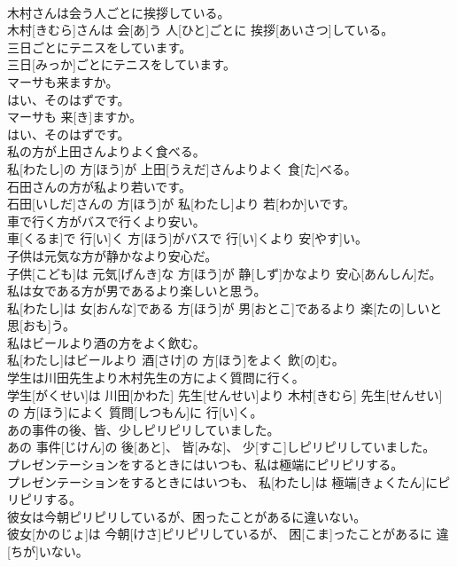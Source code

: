 \documentclass[8pt]{extreport}
\begin{document}
\begin{CJK}{UTF8}{min}
\\	木村さんは会う人ごとに挨拶している。	
\\	木村[きむら]さんは 会[あ]う 人[ひと]ごとに 挨拶[あいさつ]している。	
\\	三日ごとにテニスをしています。	
\\	三日[みっか]ごとにテニスをしています。	
\\	マーサも来ますか。 
\\	はい、そのはずです。	
\\	マーサも 来[き]ますか。 
\\	はい、そのはずです。	
\\	私の方が上田さんよりよく食べる。	
\\	私[わたし]の 方[ほう]が 上田[うえだ]さんよりよく 食[た]べる。	
\\	石田さんの方が私より若いです。	
\\	石田[いしだ]さんの 方[ほう]が 私[わたし]より 若[わか]いです。	
\\	車で行く方がバスで行くより安い。	
\\	車[くるま]で 行[い]く 方[ほう]がバスで 行[い]くより 安[やす]い。	
\\	子供は元気な方が静かなより安心だ。	
\\	子供[こども]は 元気[げんき]な 方[ほう]が 静[しず]かなより 安心[あんしん]だ。	
\\	私は女である方が男であるより楽しいと思う。	
\\	私[わたし]は 女[おんな]である 方[ほう]が 男[おとこ]であるより 楽[たの]しいと 思[おも]う。	
\\	私はビールより酒の方をよく飲む。	
\\	私[わたし]はビールより 酒[さけ]の 方[ほう]をよく 飲[の]む。	
\\	学生は川田先生より木村先生の方によく質問に行く。	
\\	学生[がくせい]は 川田[かわた] 先生[せんせい]より 木村[きむら] 先生[せんせい]の 方[ほう]によく 質問[しつもん]に 行[い]く。	
\\	あの事件の後、皆、少しピリピリしていました。	
\\	あの 事件[じけん]の 後[あと]、 皆[みな]、 少[すこ]しピリピリしていました。	
\\	プレゼンテーションをするときにはいつも、私は極端にピリピリする。	
\\	プレゼンテーションをするときにはいつも、 私[わたし]は 極端[きょくたん]にピリピリする。	
\\	彼女は今朝ピリピリしているが、困ったことがあるに違いない。	
\\	彼女[かのじょ]は 今朝[けさ]ピリピリしているが、 困[こま]ったことがあるに 違[ちが]いない。	

\end{CJK}
\end{document}
